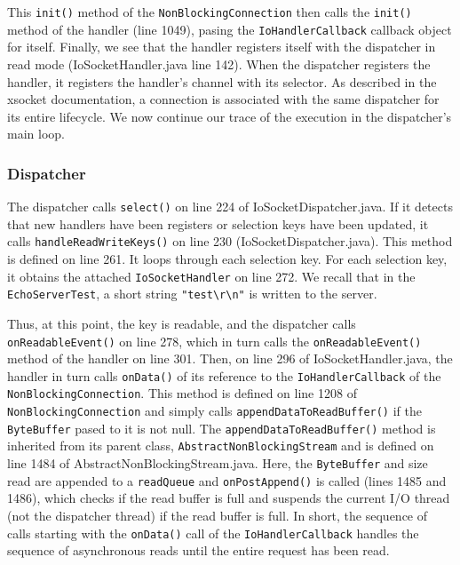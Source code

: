 \documentclass[letterpaper,12pt]{article}
\begin{document}
This \texttt{init()} method of the \texttt{NonBlockingConnection} then calls the \texttt{init()} method of the handler (line 1049), pasing the \texttt{IoHandlerCallback} callback object for itself. Finally, we see that the handler registers itself with the dispatcher in read mode (IoSocketHandler.java line 142). When the dispatcher registers the handler, it registers the handler's channel with its selector. As described in the xsocket documentation, a connection is associated with the same dispatcher for its entire lifecycle. We now continue our trace of the execution in the dispatcher's main loop.

\subsubsection{Dispatcher}

The dispatcher calls \texttt{select()} on line 224 of IoSocketDispatcher.java. If it detects that new handlers have been registers or selection keys have been updated, it calls \texttt{handleReadWriteKeys()} on line 230 (IoSocketDispatcher.java). This method is defined on line 261. It loops through each selection key. For each selection key, it obtains the attached \texttt{IoSocketHandler} on line 272. We recall that in the \texttt{EchoServerTest}, a short string \texttt{"test\textbackslash r\textbackslash n"} is written to the server. 

Thus, at this point, the key is readable, and the dispatcher calls \texttt{onReadableEvent()} on line 278, which in turn calls the \texttt{onReadableEvent()} method of the handler on line 301. Then, on line 296 of IoSocketHandler.java, the handler in turn calls \texttt{onData()} of its reference to the \texttt{IoHandlerCallback} of the \texttt{NonBlockingConnection}. This method is defined on line 1208 of \texttt{NonBlockingConnection} and simply calls \texttt{appendDataToReadBuffer()} if the \texttt{ByteBuffer} pased to it is not null. The \texttt{appendDataToReadBuffer()} method is inherited from its parent class, \texttt{AbstractNonBlockingStream} and is defined on line 1484 of AbstractNonBlockingStream.java. Here, the \texttt{ByteBuffer} and size read are appended to a \texttt{readQueue} and \texttt{onPostAppend()} is called (lines 1485 and 1486), which checks if the read buffer is full and suspends the current I/O thread (not the dispatcher thread) if the read buffer is full. In short, the sequence of calls starting with the \texttt{onData()} call of the \texttt{IoHandlerCallback} handles the sequence of asynchronous reads until the entire request has been read.
\end{document}
